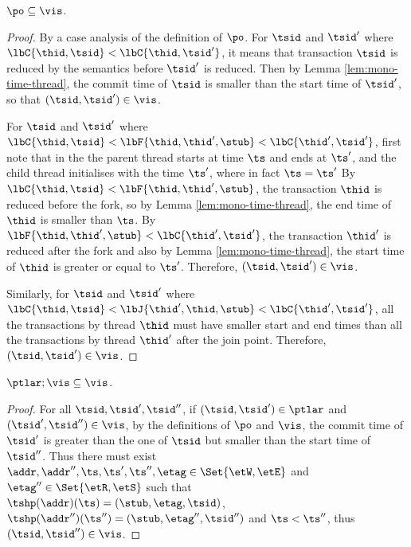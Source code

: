 \begin{lem}[Session]
    \label{lem:session}
    \( \po \subseteq \vis \).
\end{lem}   
\begin{proof}
    By a case analysis of the definition of \( \po \).
    For \( \tsid \) and \( \tsid' \) where \( \lbC{\thid,\tsid} < \lbC{\thid,\tsid'} \), it means that transaction \( \tsid \) is reduced by the semantics before \( \tsid' \) is reduced.
    Then by Lemma \ref{lem:mono-time-thread}, the commit time of \( \tsid \) is smaller than the start time of \( \tsid' \), so that \( (\tsid, \tsid') \in \vis \).

    For \( \tsid \) and \( \tsid' \) where \( \lbC{\thid,\tsid} < \lbF{\thid,\thid', \stub} < \lbC{\thid',\tsid'} \), first note that in the  the parent thread starts at time \( \ts \) and ends at \( \ts' \), and the child thread initialises with the time \( \ts' \), where  in fact \( \ts = \ts' \)
    By \( \lbC{\thid,\tsid} < \lbF{\thid,\thid', \stub}  \), the transaction \( \thid \) is reduced before the fork, so by Lemma \ref{lem:mono-time-thread}, the end time of \( \thid \) is smaller than \( \ts \).
    By \( \lbF{\thid,\thid', \stub} < \lbC{\thid',\tsid'} \), the transaction \( \thid' \) is reduced after the fork and also by Lemma \ref{lem:mono-time-thread}, the start time of \( \thid \) is greater or equal to \( \ts' \).
    Therefore, \( (\tsid, \tsid') \in \vis \).

    Similarly, for \( \tsid \) and \( \tsid' \) where \( \lbC{\thid,\tsid} < \lbJ{\thid',\thid, \stub} < \lbC{\thid',\tsid'} \), all the transactions by thread \( \thid \) must have smaller start and end times than all the transactions by thread \( \thid' \) after the join point.
    Therefore, \( (\tsid, \tsid') \in \vis \).
\end{proof}


\begin{lem}
    \label{lem:semi-prefix}
    \( \ptlar; \vis \subseteq \vis \).
\end{lem}
\begin{proof}
    For all \( \tsid, \tsid', \tsid'' \), if \( (\tsid, \tsid') \in \ptlar \) and \( (\tsid', \tsid'') \in \vis \), by the definitions of \( \po \) and \( \vis \), the commit time of \( \tsid' \) is greater than the one of \( \tsid \) but smaller than the start time of \( \tsid'' \).
    Thus there must exist \( \addr, \addr'', \ts, \ts' , \ts'', \etag \in \Set{\etW, \etE}  \) and \( \etag'' \in \Set{\etR, \etS } \) such that  \( \tshp(\addr)(\ts) = (\stub, \etag, \tsid) \), \( \tshp(\addr'')(\ts'') = (\stub, \etag'', \tsid'') \) and \( \ts < \ts'' \), thus \( ( \tsid, \tsid'' ) \in \vis \).
\end{proof}

